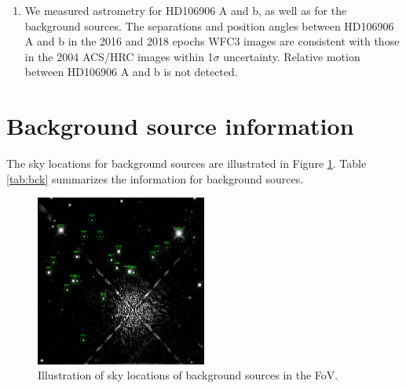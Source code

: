 \documentclass[twocolumn]{aastex62}
\begin{document}
\begin{enumerate}
\item We measured astrometry for HD106906 A and b, as well as for the background sources. The separations and position angles between HD106906 A and b in the 2016 and 2018 epochs WFC3 images are consistent with those in the 2004 ACS/HRC images within 1$\sigma$ uncertainty. Relative motion between HD106906 A and b is not detected. 
\end{enumerate}

\appendix
\section{Background source information}

The sky locations for background sources are illustrated in Figure \ref{fig:bck}. Table \ref{tab:bck} summarizes the information for background sources.

\begin{figure}[h]
  \centering
  \includegraphics[width=0.5\textwidth]{figures/backSourceLabeled.png}
  \caption{Illustration of sky locations of background sources in the FoV.}
  \label{fig:bck}
\end{figure}


  
\end{document}
